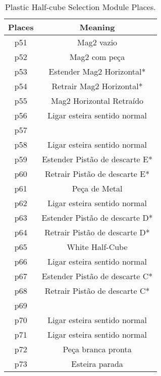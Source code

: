 \begin{table}[htbp]
\caption{Plastic Half-cube Selection Module Places.}
\centering
\begin{tabular}{cc}
Places & Meaning\\
\hline
p51 & Mag2 vazio\\
p52 & Mag2 com peça\\
p53 & Estender Mag2 Horizontal*\\
p54 & Retrair Mag2 Horizontal*\\
p55 & Mag2 Horizontal Retraído\\
p56 & Ligar esteira sentido normal\\
p57 & \\
p58 & Ligar esteira sentido normal\\
p59 & Estender Pistão de descarte E*\\
p60 & Retrair Pistão de descarte E*\\
p61 & Peça de Metal\\
p62 & Ligar esteira sentido normal\\
p63 & Estender Pistão de descarte D*\\
p64 & Retrair Pistão de descarte D*\\
p65 & White Half-Cube\\
p66 & Ligar esteira sentido normal\\
p67 & Estender Pistão de descarte C*\\
p68 & Retrair Pistão de descarte C*\\
p69 & \\
p70 & Ligar esteira sentido normal\\
p71 & Ligar esteira sentido normal\\
p72 & Peça branca pronta\\
p73 & Esteira parada\\
\end{tabular}
\end{table}

